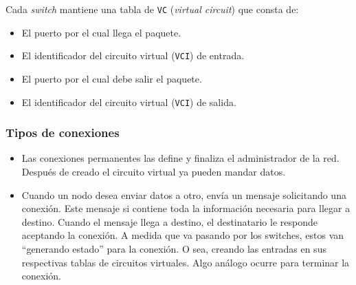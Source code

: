 \documentclass[]{article}
\begin{document}
Cada \emph{switch} mantiene una tabla de \texttt{VC} (\emph{virtual circuit}) que consta de:
\begin{itemize}
    \item El puerto por el cual llega el paquete.
    \item El identificador del circuito virtual (\texttt{VCI}) de entrada.
    \item El puerto por el cual debe salir el paquete.
    \item El identificador del circuito virtual (\texttt{VCI}) de salida.
\end{itemize}


\subsubsection{Tipos de conexiones}

\begin{itemize}
    \item Las conexiones permanentes las define y finaliza el administrador de la red. Después de creado el circuito virtual ya pueden mandar datos.
    \item Cuando un nodo desea enviar datos a otro, envía un mensaje solicitando una conexión. Este mensaje si contiene toda la información necesaria para llegar a destino. Cuando el mensaje llega a destino, el destinatario le responde aceptando la conexión. A medida que va pasando por los switches, estos van ``generando estado'' para la conexión. O sea, creando las entradas en sus respectivas tablas de circuitos virtuales. Algo análogo ocurre para terminar la conexión.
\end{itemize}
\end{document}
